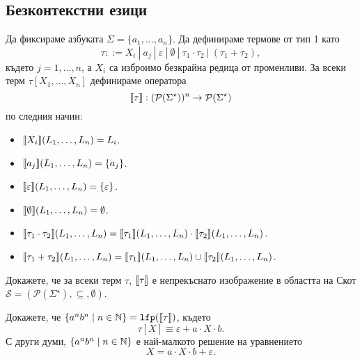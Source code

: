 


\subsection{Безконтекстни езици}

Да фиксираме азбуката $\Sigma = \{a_1,\dots,a_n\}$.
Да дефинираме термове от тип 1 като
\[\tau ::= X_i\ |\ a_j\ |\ \varepsilon\ |\ \emptyset\ |\ \tau_1 \cdot \tau_2\ |\ (\tau_1 + \tau_2),\]
където $j = 1, \dots,n$, а $X_i$ са изброимо безкрайна редица от променливи.
За всеки терм $\tau[X_1,\dots,X_n]$ дефинираме оператора 
\[\llbracket{\tau}\rrbracket: (\mathcal{P}(\Sigma^\star))^n \to \mathcal{P}(\Sigma^\star)\]
по следния начин:
\begin{itemize}
\item 
  $\llbracket{X_i}\rrbracket(L_1,\dots,L_n) = L_i$.
\item 
  $\llbracket{a_j}\rrbracket(L_1,\dots,L_n) = \{a_j\}$.
\item 
  $\llbracket{\varepsilon}\rrbracket(L_1,\dots,L_n) = \{\varepsilon\}$.
\item 
  $\llbracket{\emptyset}\rrbracket(L_1,\dots,L_n) = \emptyset$.
\item 
  $\llbracket{\tau_1 \cdot \tau_2}\rrbracket(L_1,\dots,L_n) = \llbracket{\tau_1}\rrbracket(L_1,\dots,L_n) \cdot \llbracket{\tau_2}\rrbracket(L_1,\dots,L_n)$.
\item
  $\llbracket{\tau_1 + \tau_2}\rrbracket(L_1,\dots,L_n) = \llbracket{\tau_1}\rrbracket(L_1,\dots,L_n) \cup \llbracket{\tau_2}\rrbracket(L_1,\dots,L_n)$.
\end{itemize}

\begin{problem}
  Докажете, че за всеки терм $\tau$, $\llbracket{\tau}\rrbracket$ е непрекъснато изображение в областта на Скот
  $\mathcal{S} = ( \mathcal{P}(\Sigma^\star),\subseteq, \emptyset)$.
\end{problem}

\begin{problem}
  Докажете, че $\{a^nb^n \mid n\in \mathbb{N}\} = \texttt{lfp}(\llbracket{\tau}\rrbracket)$, където 
  \[\tau[X] \equiv \varepsilon + a \cdot X \cdot b.\]
  С други думи, $\{a^nb^n \mid n \in \mathbb{N}\}$ е най-малкото решение на уравнението
  \[X = a \cdot X \cdot b + \varepsilon.\]
\end{problem}

